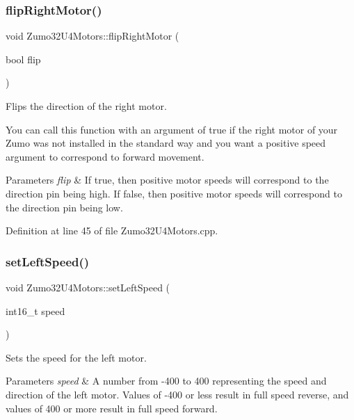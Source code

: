 \subsubsection{\texorpdfstring{flip\+Right\+Motor()}{flipRightMotor()}}
{\footnotesize\ttfamily void Zumo32\+U4\+Motors\+::flip\+Right\+Motor (\begin{DoxyParamCaption}\item[{bool}]{flip }\end{DoxyParamCaption})\hspace{0.3cm}{\ttfamily [static]}}



Flips the direction of the right motor. 

You can call this function with an argument of {\ttfamily true} if the right motor of your Zumo was not installed in the standard way and you want a positive speed argument to correspond to forward movement.


\begin{DoxyParams}{Parameters}
{\em flip} & If true, then positive motor speeds will correspond to the direction pin being high. If false, then positive motor speeds will correspond to the direction pin being low. \\
\hline
\end{DoxyParams}


Definition at line 45 of file Zumo32\+U4\+Motors.\+cpp.

\mbox{\label{class_zumo32_u4_motors_a59cb85c91d0425ae1a8116d4e6dab969}} 
\subsubsection{\texorpdfstring{set\+Left\+Speed()}{setLeftSpeed()}}
{\footnotesize\ttfamily void Zumo32\+U4\+Motors\+::set\+Left\+Speed (\begin{DoxyParamCaption}\item[{int16\+\_\+t}]{speed }\end{DoxyParamCaption})\hspace{0.3cm}{\ttfamily [static]}}



Sets the speed for the left motor. 


\begin{DoxyParams}{Parameters}
{\em speed} & A number from -\/400 to 400 representing the speed and direction of the left motor. Values of -\/400 or less result in full speed reverse, and values of 400 or more result in full speed forward. \\
\hline
\end{DoxyParams}


